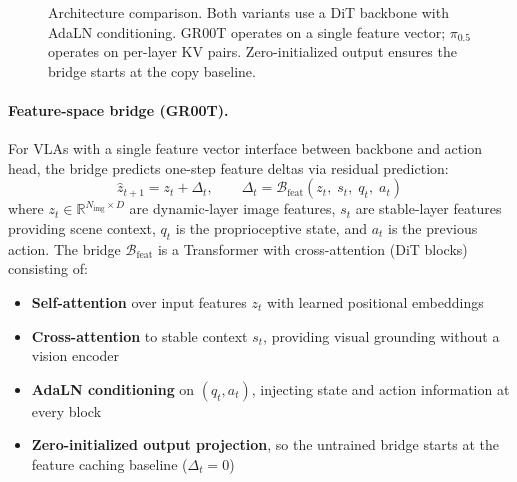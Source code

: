 \documentclass{article}
\begin{document}
\begin{figure}[t]
\centering
{}
\caption{Architecture comparison. Both variants use a DiT backbone with AdaLN conditioning. GR00T operates on a single feature vector; $\pi_{0.5}$ operates on per-layer KV pairs. Zero-initialized output ensures the bridge starts at the copy baseline.}
\label{fig:architecture}
\end{figure}

\paragraph{Feature-space bridge (GR00T).}
For VLAs with a single feature vector interface between backbone and action head, the bridge predicts one-step feature deltas via residual prediction:
\begin{equation}
    \hat{z}_{t+1} = z_t + \Delta_t, \qquad \Delta_t = \mathcal{B}_\text{feat}(z_t,\; s_t,\; q_t,\; a_t)
    \label{eq:groot_bridge}
\end{equation}
where $z_t \in \mathbb{R}^{N_\text{img} \times D}$ are dynamic-layer image features, $s_t$ are stable-layer features providing scene context, $q_t$ is the proprioceptive state, and $a_t$ is the previous action.
The bridge $\mathcal{B}_\text{feat}$ is a Transformer with cross-attention (DiT blocks) consisting of:
\begin{itemize}
    \item \textbf{Self-attention} over input features $z_t$ with learned positional embeddings
    \item \textbf{Cross-attention} to stable context $s_t$, providing visual grounding without a vision encoder
    \item \textbf{AdaLN conditioning} on $(q_t, a_t)$, injecting state and action information at every block
    \item \textbf{Zero-initialized output projection}, so the untrained bridge starts at the feature caching baseline ($\Delta_t = 0$)
\end{itemize}
\end{document}
